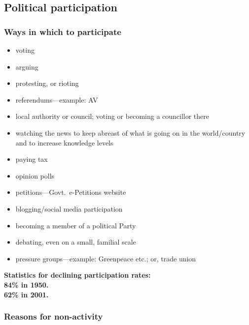 \documentclass[a4paper,12pt]{article}
\begin{document}
\subsection*{Political participation}

\subsubsection*{Ways in which to participate}

\begin{itemize}
\item{voting}
\item{arguing}
\item{protesting, or rioting}
\item{referendums---example: \textsc{AV}}
\item{local authority or council; voting or becoming a councillor there}
\item{watching the news to keep abreast of what is going on in the world/country and to increase knowledge levels}
\item{paying tax}
\item{opinion polls}
\item{petitions---Govt.\ e-Petitions website}
\item{blogging/social media participation}
\item{becoming a member of a political Party}
\item{debating, even on a small, familial scale}
\item{pressure groups---example: Greenpeace etc.; or, trade union}
\end{itemize}

\textbf{Statistics for declining participation rates:\\ 84\% in 1950.\\ 62\% in 2001.}

\subsubsection*{Reasons for non-activity}
\end{document}
